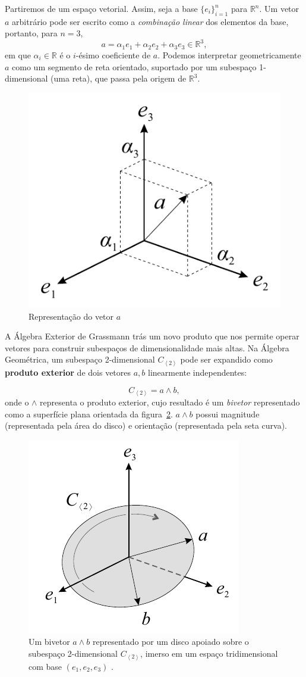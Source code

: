 \documentclass[11pt]{article}
\begin{document}
Partiremos de um espaço vetorial. Assim, seja a base $\{e_i\}^n_{i=1}$ para $\mathbb{R}^n$. Um vetor $a$ arbitrário pode ser escrito como a \textit{combinação linear} dos elementos da base, portanto, para $n=3$, $$a = \alpha_1e_1 + \alpha_2e_2 + \alpha_3e_3\in \mathbb{R}^3,$$
em que $\alpha_i\in \mathbb{R}$ é o $i$-ésimo coeficiente de $a$. Podemos interpretar geometricamente $a$ como um segmento de reta orientado, suportado por um subespaço 1-dimensional (uma reta), que passa pela origem de $\mathbb{R}^3$.

\begin{figure}[H]
	\begin{center}
		\includegraphics[width=0.25\linewidth]{figures/aR3.png}
	\end{center}
	\caption{Representação do vetor $a$ \cite{leandro2017algebra}}
	\label{fig:r3}
\end{figure}

A Álgebra Exterior de Grassmann trás um novo produto que nos permite operar vetores para construir subespaços de dimensionalidade mais altas. Na Álgebra Geométrica, um subespaço 2-dimensional $C_{\left <2 \right >}$ pode ser expandido como \textbf{produto exterior} de dois vetores $a,b$ linearmente independentes:

$$C_{\left <2 \right >} = a \wedge b,$$
onde o $\wedge$ representa o produto exterior, cujo resultado é um \textit{bivetor} representado como a superfície plana orientada da figura~\ref{fig:2blade}. $a\wedge b$ possui magnitude (representada pela área do disco) e orientação (representada pela seta curva). 

\begin{figure}[H]
	\begin{center}
		\includegraphics[width=0.25\linewidth]{figures/2blade.png}
	\end{center}
	\caption{Um bivetor $a\wedge b$ representado por um disco apoiado sobre o subespaço 2-dimensional $C_{\left < 2\right >}$, imerso em um espaço tridimensional com base $(e_1,e_2,e_3)$  \cite{leandro2017algebra}.}
	\label{fig:2blade}
\end{figure}
\end{document}
